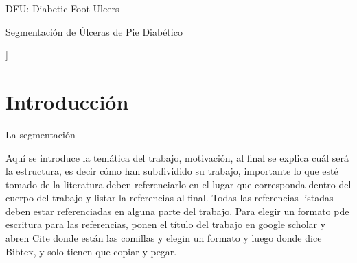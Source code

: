 \documentclass[a4paper,10pt,twocolumn]{article}
\begin{document}
\begin{keywords}
DFU: Diabetic Foot Ulcers

\end{keywords}

\begin{topics}
Segmentaci\'on de \'Ulceras de Pie Diab\'etico
\end{topics}


\vspace{0.8cm}
]



\section{Introducción}\label{sec:intro}


La segmentaci\'on


Aqu\'{i} se introduce la tem\'{a}tica del trabajo, motivaci\'{o}n, al final se explica cu\'{a}l ser\'{a} la estructura, es decir c\'{o}mo han subdividido su trabajo, importante lo que est\'{e} tomado de la literatura deben referenciarlo en el lugar que corresponda dentro del cuerpo del trabajo y listar la referencias al final. Todas las referencias listadas deben estar referenciadas en alguna parte del trabajo.
Para elegir un formato pde escritura para las referencias, ponen el t\'{i}tulo del trabajo en google scholar y abren Cite donde est\'{a}n las comillas y elegin un formato y luego donde dice Bibtex, y solo tienen que copiar y pegar.
\end{document}
